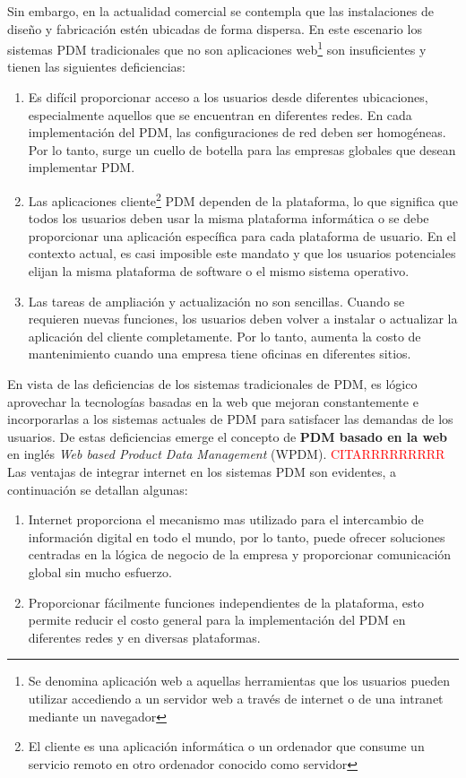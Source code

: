 Sin embargo, en la actualidad comercial se contempla que las instalaciones de diseño y fabricación estén ubicadas de forma dispersa. En este escenario los sistemas PDM tradicionales que no son aplicaciones web\footnote{Se denomina aplicación web a aquellas herramientas que los usuarios pueden utilizar accediendo a un servidor web a través de internet o de una intranet mediante un navegador} son insuficientes y tienen las siguientes deficiencias:

\begin{enumerate}
    \item Es difícil proporcionar acceso a los usuarios desde diferentes ubicaciones, especialmente aquellos que se encuentran en diferentes redes. En cada implementación del PDM, las configuraciones de red deben ser homogéneas. Por lo tanto, surge un cuello de botella para las empresas globales que desean implementar PDM.
    \item Las aplicaciones cliente\footnote{El cliente es una aplicación informática o un ordenador que consume un servicio remoto en otro ordenador conocido como servidor} PDM dependen de la plataforma, lo que significa que todos los usuarios deben usar la misma plataforma informática o se debe proporcionar una aplicación específica para cada plataforma de usuario. En el contexto actual, es casi imposible este mandato y que los usuarios potenciales elijan la misma plataforma de software o el mismo sistema operativo.
    \item Las tareas de ampliación y actualización no son sencillas. Cuando se requieren nuevas funciones, los usuarios deben volver a instalar o actualizar la aplicación del cliente completamente. Por lo tanto, aumenta la costo de mantenimiento cuando una empresa tiene oficinas en diferentes sitios.
\end{enumerate}

En vista de las deficiencias de los sistemas tradicionales de PDM, es lógico aprovechar la tecnologías basadas en la web que mejoran constantemente e incorporarlas a los sistemas actuales de PDM para satisfacer las demandas de los usuarios.
De estas deficiencias emerge el concepto de \textbf{PDM basado en la web} en inglés \textit{Web based Product Data Management} (WPDM).
\textcolor{red}{CITARRRRRRRRR}
Las ventajas de integrar internet en los sistemas PDM son evidentes, a continuación se detallan algunas:
\begin{enumerate}
    \item Internet proporciona el mecanismo mas utilizado para el intercambio de información digital en todo el mundo, por lo tanto, puede ofrecer soluciones centradas en la lógica de negocio de la empresa y proporcionar comunicación global sin mucho esfuerzo.
    \item Proporcionar fácilmente funciones independientes de la plataforma, esto permite reducir el costo general para la implementación del PDM en diferentes redes y en diversas plataformas.
\end{enumerate}

